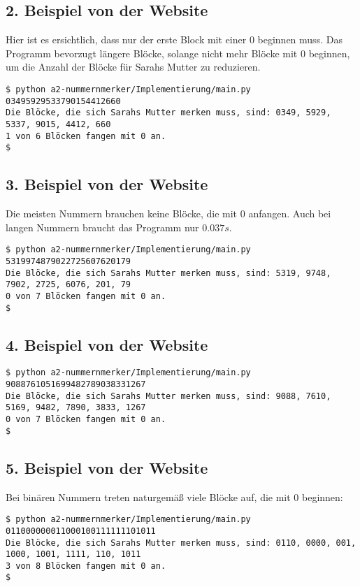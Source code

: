\documentclass[a4paper,10pt,ngerman]{scrartcl}
\begin{document}
\subsection{2. Beispiel von der Website}
Hier ist es ersichtlich, dass nur der erste Block mit einer 0 beginnen muss.
Das Programm bevorzugt längere Blöcke, solange nicht mehr Blöcke mit 0 beginnen, um die Anzahl der Blöcke für Sarahs Mutter zu reduzieren.

\begin{lstlisting}
$ python a2-nummernmerker/Implementierung/main.py 03495929533790154412660
Die Blöcke, die sich Sarahs Mutter merken muss, sind: 0349, 5929, 5337, 9015, 4412, 660
1 von 6 Blöcken fangen mit 0 an.
$ 
\end{lstlisting}

\subsection{3. Beispiel von der Website}
Die meisten Nummern brauchen keine Blöcke, die mit 0 anfangen.
Auch bei langen Nummern braucht das Programm nur $0.037 s$.
\begin{lstlisting}
$ python a2-nummernmerker/Implementierung/main.py 5319974879022725607620179
Die Blöcke, die sich Sarahs Mutter merken muss, sind: 5319, 9748, 7902, 2725, 6076, 201, 79
0 von 7 Blöcken fangen mit 0 an.
$ 
\end{lstlisting}

\subsection{4. Beispiel von der Website}
\begin{lstlisting}
$ python a2-nummernmerker/Implementierung/main.py 9088761051699482789038331267
Die Blöcke, die sich Sarahs Mutter merken muss, sind: 9088, 7610, 5169, 9482, 7890, 3833, 1267
0 von 7 Blöcken fangen mit 0 an.
$ 
\end{lstlisting}

\subsection{5. Beispiel von der Website}
Bei binären Nummern treten naturgemäß viele Blöcke auf, die mit 0 beginnen:
\begin{lstlisting}
$ python a2-nummernmerker/Implementierung/main.py 011000000011000100111111101011
Die Blöcke, die sich Sarahs Mutter merken muss, sind: 0110, 0000, 001, 1000, 1001, 1111, 110, 1011
3 von 8 Blöcken fangen mit 0 an.
$ 
\end{lstlisting}
\end{document}
